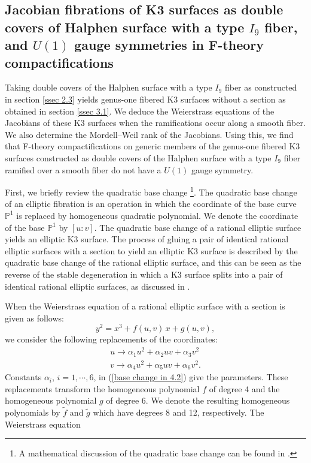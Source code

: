 \documentclass[12pt]{article}
\def\P{\mathbb{P}}
\def\til{\tilde}
\begin{document}
\subsection{Jacobian fibrations of K3 surfaces as double covers of Halphen surface with a type $I_9$ fiber, and $U(1)$ gauge symmetries in F-theory compactifications}
\label{ssec4.2}
Taking double covers of the Halphen surface with a type $I_9$ fiber as constructed in section \ref{ssec 2.3} yields genus-one fibered K3 surfaces without a section as obtained in section \ref{ssec 3.1}. We deduce the Weierstrass equations of the Jacobians of these K3 surfaces when the ramifications occur along a smooth fiber. We also determine the Mordell--Weil rank of the Jacobians. Using this, we find that F-theory compactifications on generic members of the genus-one fibered K3 surfaces constructed as double covers of the Halphen surface with a type $I_9$ fiber ramified over a smooth fiber do not have a $U(1)$ gauge symmetry.
\par First, we briefly review the quadratic base change \footnote{A mathematical discussion of the quadratic base change can be found in \cite{SchShio}.}. The quadratic base change of an elliptic fibration is an operation in which the coordinate of the base curve $\P^1$ is replaced by homogeneous quadratic polynomial. We denote the coordinate of the base $\P^1$ by $[u:v]$. The quadratic base change of a rational elliptic surface yields an elliptic K3 surface. The process of gluing a pair of identical rational elliptic surfaces with a section to yield an elliptic K3 surface is described by the quadratic base change of the rational elliptic surface, and this can be seen as the reverse of the stable degeneration in which a K3 surface splits into a pair of identical rational elliptic surfaces, as discussed in \cite{Kimura1710}.
\par When the Weierstrass equation of a rational elliptic surface with a section is given as follows:
\begin{equation}
\label{RES in 4.2}
y^2=x^3+f(u,v)\, x+g(u,v),
\end{equation}
we consider the following replacements of the coordinates:
\begin{eqnarray}
\label{base change in 4.2}
u \rightarrow \alpha_1 u^2 +\alpha_2 uv + \alpha_3 v^2 \\ \nonumber
v \rightarrow \alpha_4 u^2 +\alpha_5 uv + \alpha_6 v^2.
\end{eqnarray}
Constants $\alpha_i$, $i=1, \cdots, 6$, in (\ref{base change in 4.2}) give the parameters. These replacements transform the homogeneous polynomial $f$ of degree 4 and the homogeneous polynomial $g$ of degree 6. We denote the resulting homogeneous polynomials by $\til{f}$ and $\til{g}$ which have degrees 8 and 12, respectively. The Weierstrass equation 
\end{document}

